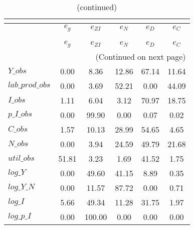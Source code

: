  
\begin{center}
\begin{longtable}{lccccc} 
\caption{VARIANCE DECOMPOSITION (in percent)}\\
 \label{Table:th_var_decomp_uncond}\\
\toprule 
$                $	 & 	 $       {e_g}$	 & 	 $    {e_{ZI}}$	 & 	 $       {e_N}$	 & 	 $       {e_D}$	 & 	 $       {e_C}$\\
\midrule \endfirsthead 
\caption{(continued)}\\
 \toprule \\ 
$                $	 & 	 $       {e_g}$	 & 	 $    {e_{ZI}}$	 & 	 $       {e_N}$	 & 	 $       {e_D}$	 & 	 $       {e_C}$\\
\midrule \endhead 
\midrule \multicolumn{6}{r}{(Continued on next page)} \\ \bottomrule \endfoot 
\bottomrule \endlastfoot 
$Y\_obs          $	 & 	        0.00	 & 	        8.36	 & 	       12.86	 & 	       67.14	 & 	       11.64 \\ 
$lab\_prod\_obs  $	 & 	        0.00	 & 	        3.69	 & 	       52.21	 & 	        0.00	 & 	       44.09 \\ 
$I\_obs          $	 & 	        1.11	 & 	        6.04	 & 	        3.12	 & 	       70.97	 & 	       18.75 \\ 
$p\_I\_obs       $	 & 	        0.00	 & 	       99.90	 & 	        0.00	 & 	        0.07	 & 	        0.02 \\ 
$C\_obs          $	 & 	        1.57	 & 	       10.13	 & 	       28.99	 & 	       54.65	 & 	        4.65 \\ 
$N\_obs          $	 & 	        0.00	 & 	        3.94	 & 	       24.59	 & 	       49.79	 & 	       21.68 \\ 
$util\_obs       $	 & 	       51.81	 & 	        3.23	 & 	        1.69	 & 	       41.52	 & 	        1.75 \\ 
$log\_Y          $	 & 	        0.00	 & 	       49.60	 & 	       41.15	 & 	        8.89	 & 	        0.35 \\ 
$log\_Y\_N       $	 & 	        0.00	 & 	       11.57	 & 	       87.72	 & 	        0.00	 & 	        0.71 \\ 
$log\_I          $	 & 	        5.66	 & 	       49.34	 & 	       11.28	 & 	       31.75	 & 	        1.97 \\ 
$log\_p\_I       $	 & 	        0.00	 & 	      100.00	 & 	        0.00	 & 	        0.00	 & 	        0.00 \\ 

\end{longtable}
\end{center}
